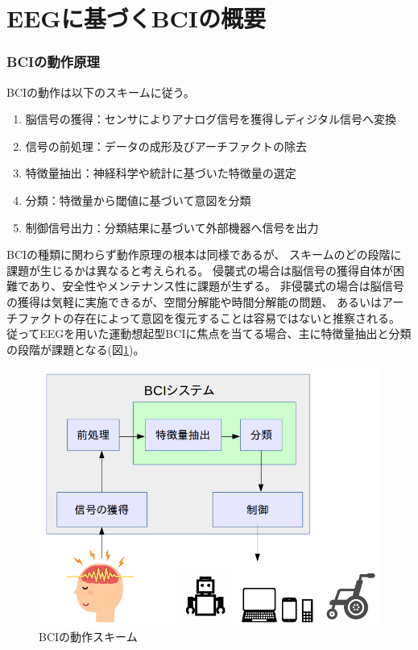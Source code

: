 \section{{\rm EEG}\mc に基づく{\rm BCI}{\mc の概要}}
\subsubsection{\rm BCI\mc の動作原理}
BCIの動作は以下のスキームに従う。
\begin{enumerate}
    \item 脳信号の獲得：センサによりアナログ信号を獲得しディジタル信号へ変換
    \item 信号の前処理：データの成形及びアーチファクトの除去
    \item 特徴量抽出：神経科学や統計に基づいた特徴量の選定
    \item 分類：特徴量から閾値に基づいて意図を分類
    \item 制御信号出力：分類結果に基づいて外部機器へ信号を出力
\end{enumerate}
BCIの種類に関わらず動作原理の根本は同様であるが、
スキームのどの段階に課題が生じるかは異なると考えられる。
侵襲式の場合は脳信号の獲得自体が困難であり、安全性やメンテナンス性に課題が生ずる。
非侵襲式の場合は脳信号の獲得は気軽に実施できるが、空間分解能や時間分解能の問題、
あるいはアーチファクトの存在によって意図を復元することは容易ではないと推察される。
従ってEEGを用いた運動想起型BCIに焦点を当てる場合、主に特徴量抽出と分類の段階が課題となる(図\ref{fig:BCIsystem})。

\begin{figure}[tb]
    \centering
    \includegraphics[width=13cm]{images/BCIsystem.png}
    \caption{BCIの動作スキーム}
    \label{fig:BCIsystem}
\end{figure}

